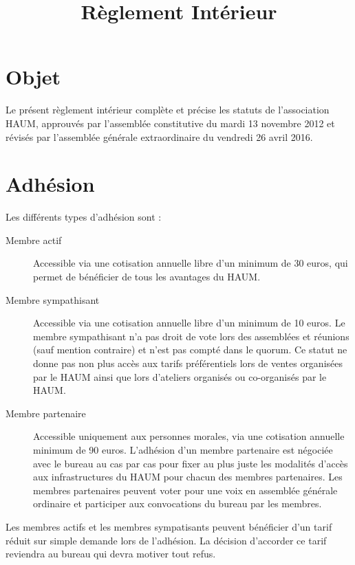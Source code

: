 \documentclass[a4paper, 11pt]{article}
\title{Règlement Intérieur}
\author{}
\date{}
\newcommand{\nomHS}{HAUM}
\newcommand{\dateAGC}{mardi 13 novembre 2012}
\newcommand{\dateAGE}{vendredi 26 avril 2016}
\newcommand{\prixNormal}{30 euros}
\newcommand{\prixSympatisant}{10 euros}
\newcommand{\prixPartenaire}{90 euros}
\begin{document}
    \maketitle

\section{Objet} %

Le présent règlement intérieur complète et précise les statuts de l'association \og{}\nomHS\fg{}, approuvés par l'assemblée
constitutive du \dateAGC{} et révisés par l'assemblée générale extraordinaire du \dateAGE{}.


\section{Adhésion} %

Les différents types d'adhésion sont :

\begin{description}
	\item[Membre actif] Accessible via une cotisation annuelle libre d'un minimum de \prixNormal{}, qui permet de bénéficier de tous les avantages du \nomHS{}.
	\item[Membre sympathisant] Accessible via une cotisation annuelle libre d'un minimum de \prixSympatisant{}. Le membre sympathisant n'a pas droit de vote lors des assemblées et réunions (sauf mention contraire) et n'est pas compté dans le quorum. Ce statut ne donne pas non plus accès aux tarifs préférentiels lors de ventes organisées par le \nomHS{} ainsi que lors d'ateliers organisés ou co-organisés par le \nomHS{}.
	\item[Membre partenaire] Accessible uniquement aux personnes morales, via une cotisation annuelle minimum de \prixPartenaire{}. L'adhésion d'un membre partenaire est négociée avec le bureau au cas par cas pour fixer au plus juste les modalités d'accès aux infrastructures du \nomHS{} pour chacun des membres partenaires. Les membres partenaires peuvent voter pour une voix en assemblée générale ordinaire et participer aux convocations du bureau par les membres.
\end{description}

Les membres actifs et les membres sympatisants peuvent bénéficier d'un tarif réduit sur simple demande lors de l'adhésion.
La décision d'accorder ce tarif reviendra au bureau qui devra motiver tout refus.
\end{document}
